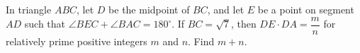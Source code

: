 In triangle $ABC$, let $D$ be the midpoint of $BC$, and let $E$ be a point on segment $AD$ such that $\angle BEC+\angle BAC=180^\circ$. If $BC=\sqrt7$, then $DE\cdot DA=\dfrac mn$ for relatively prime positive integers $m$ and $n$. Find $m+n$.

